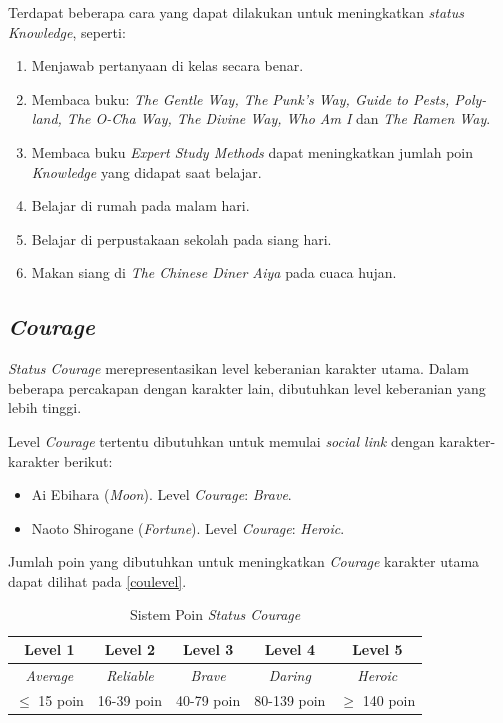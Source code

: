 Terdapat beberapa cara yang dapat dilakukan untuk meningkatkan \textit{status Knowledge}, seperti:
\begin{enumerate}
    \item Menjawab pertanyaan di kelas secara benar. %
    \item Membaca buku: \textit{The Gentle Way, The Punk’s Way, Guide to Pests, Poly-land, The O-Cha Way, The Divine Way, Who Am I} dan \textit{The Ramen Way}. %
    \item Membaca buku \textit{Expert Study Methods} dapat meningkatkan jumlah poin \textit{Knowledge} yang didapat saat belajar.
    \item Belajar di rumah pada malam hari. %
    \item Belajar di perpustakaan sekolah pada siang hari.  %
    \item Makan siang di \textit{The Chinese Diner Aiya} pada cuaca hujan.
\end{enumerate}

\subsection{\textit{Courage}}
\textit{Status Courage} merepresentasikan level keberanian karakter utama. Dalam beberapa percakapan dengan karakter lain, dibutuhkan level keberanian yang lebih tinggi.

Level \textit{Courage} tertentu dibutuhkan untuk memulai \textit{social link} dengan karakter-karakter berikut:
\begin{itemize}
    \item Ai Ebihara (\textit{Moon}). Level \textit{Courage}: \textit{Brave}.
    \item Naoto Shirogane (\textit{Fortune}). Level \textit{Courage}: \textit{Heroic}.
\end{itemize}

Jumlah poin yang dibutuhkan untuk meningkatkan \textit{Courage} karakter utama dapat dilihat pada \autoref{coulevel}.
\begin{table}[H]
    \caption{\label{coulevel}Sistem Poin \textit{Status Courage}}
    \begin{center}
        \begin{tabular}{ | c | c | c | c | c | }
            \hline
            \textbf{Level 1} & \textbf{Level 2}  & \textbf{Level 3} & \textbf{Level 4} & \textbf{Level 5} \\
            \hline
            \textit{Average} & \textit{Reliable} & \textit{Brave}   & \textit{Daring}  & \textit{Heroic}  \\
            \hline
            $\le$ 15 poin    & 16-39 poin        & 40-79 poin       & 80-139 poin      & $\ge$ 140 poin   \\
            \hline
        \end{tabular}
    \end{center}
\end{table}


